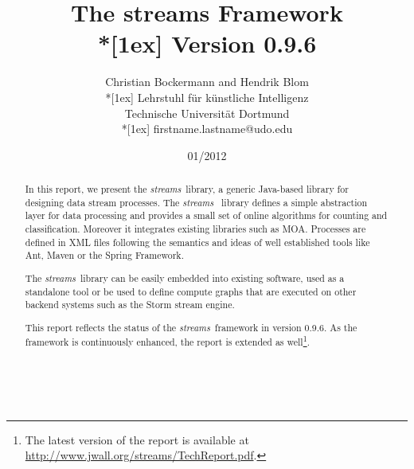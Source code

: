 \documentclass{TechReport}
\date{01/2012}  %
\title{The \textsf{streams} Framework \\*[1ex] {\large Version 0.9.6}}
\author{{\large Christian Bockermann and Hendrik Blom\\*[1ex]
  Lehrstuhl f\"ur k\"unstliche Intelligenz\\
  Technische Universit\"at Dortmund\\*[1ex]
  {\ttfamily firstname.lastname@udo.edu}}}
\date{}
\newcommand{\streams}{{\em streams}\ }
\begin{document}
\makesfbtitlepage

\newpage
\tableofcontents
\cleardoublepage
\ 
\newpage

\begin{abstract}
{\normalsize
  In this report, we present the \streams library, a generic
  Java-based library for designing data stream processes. The \streams
  library defines a simple abstraction layer for data processing and
  provides a small set of online algorithms for counting and
  classification. Moreover it integrates existing libraries such as
  MOA. Processes are defined in XML files following the
  semantics and ideas of well established tools like Ant, Maven or the
  Spring Framework.

  The \streams library can be easily embedded into existing software,
  used as a standalone tool or be used to define compute graphs that
  are executed on other backend systems such as the Storm stream
  engine.  
}

\medskip 

{\normalsize
This report reflects the status of the \streams framework in version
0.9.6. As the framework is continuously enhanced, the report is
extended as well\footnote{The latest version of the report is available at \url{http://www.jwall.org/streams/TechReport.pdf}.}.
}
\end{abstract}


%


%
\newpage






%
%
%

%



\newpage



%


%




\end{document}
